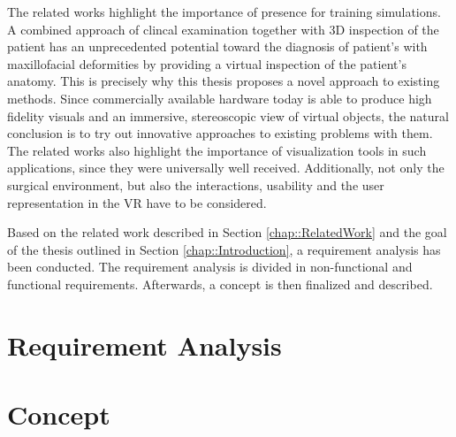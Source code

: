 The related works highlight the importance of presence for training simulations.
A combined approach of clincal examination together with 3D inspection of the patient has an unprecedented potential toward the diagnosis of patient’s with maxillofacial deformities \cite{swennen2009three} by providing a virtual inspection of the patient’s anatomy.
This is precisely why this thesis proposes a novel approach to existing methods.
Since commercially available hardware today is able to produce high fidelity visuals and an immersive, stereoscopic view of virtual objects,
the natural conclusion is to try out innovative approaches to existing problems with them.
The related works also highlight the importance of visualization tools in such applications, since they were universally well received. 
Additionally, not only the surgical environment, but also the interactions, usability and the user representation in the VR have to be considered.

Based on the related work described in Section \ref{chap::RelatedWork} and the goal of the thesis outlined in Section \ref{chap::Introduction}, a requirement analysis has been conducted.
The requirement analysis is divided in non-functional and functional requirements.
Afterwards, a concept is then finalized and described.

\section{\label{sec::RequirementAnalysis}Requirement Analysis}

\section{\label{sec::Concept}Concept}
